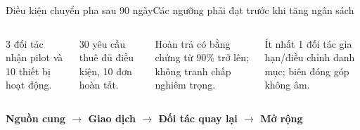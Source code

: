 \begin{frame}{Điều kiện chuyển pha sau 90 ngày}{Các ngưỡng phải đạt trước khi tăng ngân sách}
  \vspace{.8em}
  \begin{columns}[T,onlytextwidth]
      \par\vspace{.4em}
      3 đối tác nhận pilot và 10 thiết bị hoạt động.
      \par\vspace{.4em}
      30 yêu cầu thuê đủ điều kiện, 10 đơn hoàn tất.
      \par\vspace{.4em}
      Hoàn trả có bằng chứng từ 90\% trở lên; không tranh chấp nghiêm trọng.
      \par\vspace{.4em}
      Ít nhất 1 đối tác gia hạn/điều chỉnh danh mục; biên đóng góp không âm.
  \end{columns}
  \vfill
  \centering\large\textcolor{mutuxBlue}{\textbf{Nguồn cung $\rightarrow$ Giao dịch $\rightarrow$ Đối tác quay lại $\rightarrow$ Mở rộng}}
\end{frame}
